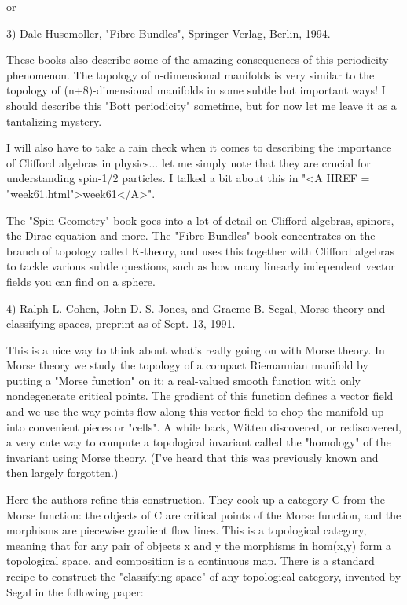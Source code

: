 or

3) Dale Husemoller, "Fibre Bundles", Springer-Verlag, Berlin, 1994.

These books also describe some of the amazing consequences of this
periodicity phenomenon.  The topology of n-dimensional manifolds is very
similar to the topology of (n+8)-dimensional manifolds in some subtle
but important ways!  I should describe this "Bott periodicity" sometime,
but for now let me leave it as a tantalizing mystery.  

I will also have to take a rain check when it comes to describing the
importance of Clifford algebras in physics... let me simply note that
they are crucial for understanding spin-1/2 particles.  I talked a bit
about this in "<A HREF = "week61.html">week61</A>".  

The "Spin Geometry" book goes into a lot of detail on Clifford algebras,
spinors, the Dirac equation and more.  The "Fibre Bundles" book
concentrates on the branch of topology called K-theory, and uses this
together with Clifford algebras to tackle various subtle questions, such
as how many linearly independent vector fields you can find on a sphere.

4) Ralph L. Cohen, John D. S. Jones, and Graeme B. Segal, Morse theory
and classifying spaces, preprint as of Sept. 13, 1991.

This is a nice way to think about what's really going on with Morse
theory.  In Morse theory we study the topology of a compact Riemannian
manifold by putting a "Morse function" on it: a real-valued smooth
function with only nondegenerate critical points.  The gradient of this
function defines a vector field and we use the way points flow along
this vector field to chop the manifold up into convenient pieces or
"cells".  A while back, Witten discovered, or rediscovered, a very cute
way to compute a topological invariant called the "homology" of the
invariant using Morse theory.  (I've heard that this was previously
known and then largely forgotten.)  

Here the authors refine this construction.  They cook up a category C
from the Morse function: the objects of C are critical points of the
Morse function, and the morphisms are piecewise gradient flow lines.
This is a topological category, meaning that for any pair of objects x
and y the morphisms in hom(x,y) form a topological space, and
composition is a continuous map.  There is a standard recipe to
construct the "classifying space" of any topological category, invented
by Segal in the following paper:

